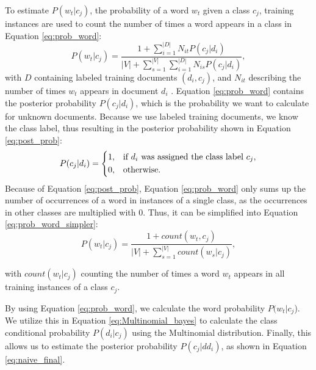         To estimate $P(w_t|c_j)$, the probability of a word $w_t$ given a class $c_j$, training instances are used to count the number of times a word appears in a class in Equation \eqref{eq:prob_word}:
        \begin{equation}
            \label{eq:prob_word}
                P(w_t|c_j) = \frac{1 + \sum_{i=1}^{|D|}N_{it} P(c_j|d_i)}{|V| + \sum_{s=1}^{|V|} \sum_{i=1}^{|D|}N_{is} P (c_j|d_i)}, 
        \end{equation}
        with $D$ containing labeled training documents $(d_i,c_j)$, and $N_{it}$ describing the number of times $w_t$ appears in document $d_i$ \cite{Mccallum1998}.
        Equation \eqref{eq:prob_word} contains the posterior probability $P(c_j|d_i)$, which is the probability we want to calculate for unknown documents. Because we use labeled training documents, we know the class label, thus resulting in the posterior probability shown in Equation \eqref{eq:post_prob}:
        \begin{equation}
                \label{eq:post_prob}
                P(c_j|d_i)= 
                \begin{dcases}
                1,& \text{if } d_i \text{ was assigned the class label } c_j, \\
                0,              & \text{otherwise.}
        \end{dcases}
        \end{equation}
        Because of Equation \eqref{eq:post_prob}, Equation \eqref{eq:prob_word} only sums up the number of occurrences of a word in instances of a single class, as the occurrences in other classes are multiplied with 0. Thus, it can be simplified into Equation \eqref{eq:prob_word_simpler}:
                \begin{equation}
            \label{eq:prob_word_simpler}
                P(w_t|c_j) = \frac{1 + count(w_t, c_j)}{|V| + \sum_{s=1}^{|V|}count(w_s|c_j)}, 
        \end{equation}

        with $count(w_t|c_j)$ counting the number of times a word $w_t$ appears in all training instances of a class $c_j$.
        
        By using Equation \eqref{eq:prob_word}, we calculate the word probability $P(w_t|c_j$). We utilize this in Equation \eqref{eq:Multinomial_bayes} to calculate the class conditional probability $P(d_i|c_j)$ using the Multinomial distribution. Finally, this allows us to estimate the posterior probability $P(c_j|dd_i)$, as shown in Equation \eqref{eq:naive_final}.
        
